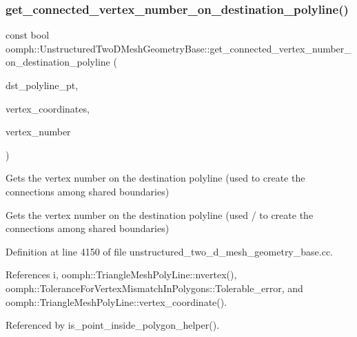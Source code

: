 \subsubsection{\texorpdfstring{get\+\_\+connected\+\_\+vertex\+\_\+number\+\_\+on\+\_\+destination\+\_\+polyline()}{get\_connected\_vertex\_number\_on\_destination\_polyline()}}
{\footnotesize\ttfamily const bool oomph\+::\+Unstructured\+Two\+D\+Mesh\+Geometry\+Base\+::get\+\_\+connected\+\_\+vertex\+\_\+number\+\_\+on\+\_\+destination\+\_\+polyline (\begin{DoxyParamCaption}\item[{\hyperlink{classoomph_1_1TriangleMeshPolyLine}{Triangle\+Mesh\+Poly\+Line} $\ast$}]{dst\+\_\+polyline\+\_\+pt,  }\item[{\hyperlink{classoomph_1_1Vector}{Vector}$<$ double $>$ \&}]{vertex\+\_\+coordinates,  }\item[{unsigned \&}]{vertex\+\_\+number }\end{DoxyParamCaption})}



Gets the vertex number on the destination polyline (used to create the connections among shared boundaries) 

Gets the vertex number on the destination polyline (used / to create the connections among shared boundaries) 

Definition at line 4150 of file unstructured\+\_\+two\+\_\+d\+\_\+mesh\+\_\+geometry\+\_\+base.\+cc.



References i, oomph\+::\+Triangle\+Mesh\+Poly\+Line\+::nvertex(), oomph\+::\+Tolerance\+For\+Vertex\+Mismatch\+In\+Polygons\+::\+Tolerable\+\_\+error, and oomph\+::\+Triangle\+Mesh\+Poly\+Line\+::vertex\+\_\+coordinate().



Referenced by is\+\_\+point\+\_\+inside\+\_\+polygon\+\_\+helper().

\mbox{\label{classoomph_1_1UnstructuredTwoDMeshGeometryBase_ae6266526c3321933f8e13f3b53d234bf}} 
